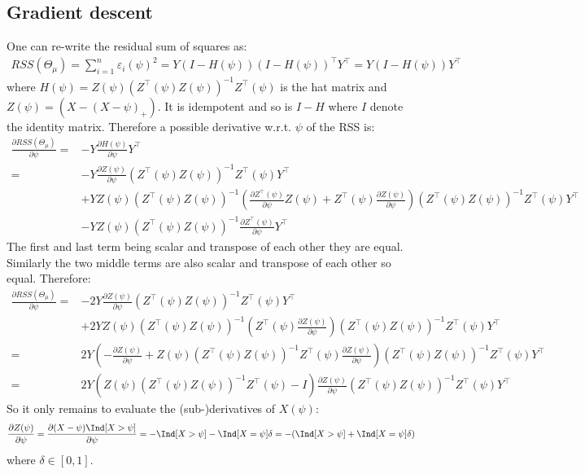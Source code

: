 \documentclass[12pt]{article}
\newcommand\trans[1]{{#1}^\intercal}%
\begin{document}
\clearpage
\subsection{Gradient descent}
\label{sec:org3b696b5}

One can re-write the residual sum of squares as:
\begin{align*}
RSS(\Theta_\mu) = \sum_{i=1}^n \varepsilon_i(\psi)^2  = Y (I-H(\psi))\trans{(I-H(\psi))}\trans{Y} = Y (I-H(\psi))\trans{Y}
\end{align*}
where \(H(\psi) =
Z(\psi)\left(\trans{Z}(\psi)Z(\psi)\right)^{-1}\trans{Z}(\psi)\) is
the hat matrix and \({Z(\psi)=(X-(X-\psi)_+)}\). It is idempotent and so is \(I-H\) where \(I\) denote
the identity matrix. Therefore a possible derivative w.r.t. \(\psi\) of the RSS is:
\begin{align*}
\frac{\partial RSS(\Theta_\mu)}{\partial \psi} =& - Y \frac{\partial H(\psi)}{\partial \psi} \trans{Y} \\
 =& - Y \frac{\partial Z(\psi)}{\partial \psi} \left(\trans{Z}(\psi) Z(\psi)\right)^{-1}\trans{Z}(\psi) \trans{Y} \\
  & + Y Z(\psi) \left(\trans{Z}(\psi) Z(\psi)\right)^{-1} \left(\frac{\partial \trans{Z}(\psi)}{\partial \psi}Z(\psi)+\trans{Z}(\psi)\frac{\partial Z(\psi)}{\partial \psi} \right) \left(\trans{Z}(\psi) Z(\psi)\right)^{-1}\trans{Z}(\psi) \trans{Y} \\
  &  - Y Z(\psi) \left(\trans{Z}(\psi)  Z(\psi)\right)^{-1} \frac{\partial \trans{Z}(\psi)}{\partial \psi} \trans{Y}
\end{align*}
The first and last term being scalar and transpose of each other they
are equal. Similarly the two middle terms are also scalar and
transpose of each other so equal. Therefore:
\begin{align*}
\frac{\partial RSS(\Theta_\mu)}{\partial \psi}
=& - 2 Y \frac{\partial Z(\psi)}{\partial \psi} \left(\trans{Z}(\psi) Z(\psi)\right)^{-1}\trans{Z}(\psi) \trans{Y} \\
 & + 2 Y Z(\psi) \left(\trans{Z}(\psi) Z(\psi)\right)^{-1} \left(\trans{Z}(\psi)\frac{\partial Z(\psi)}{\partial \psi} \right) \left(\trans{Z}(\psi) Z(\psi)\right)^{-1}\trans{Z}(\psi) \trans{Y} \\
=& 2 Y \left(- \frac{\partial Z(\psi)}{\partial \psi} + Z(\psi) \left(\trans{Z}(\psi) Z(\psi)\right)^{-1} \trans{Z}(\psi)\frac{\partial Z(\psi)}{\partial \psi} \right) \left(\trans{Z}(\psi) Z(\psi)\right)^{-1}\trans{Z}(\psi) \trans{Y} \\
=& 2 Y \left(Z(\psi) \left(\trans{Z}(\psi) Z(\psi)\right)^{-1} \trans{Z}(\psi) - I \right) \frac{\partial Z(\psi)}{\partial \psi} \left(\trans{Z}(\psi) Z(\psi)\right)^{-1}\trans{Z}(\psi) \trans{Y}
\end{align*}
So it only remains to evaluate the (sub-)derivatives of \(X(\psi)\):
\begin{align*}
\frac{\partial Z(\psi)}{\partial \psi} = \frac{\partial (X-\psi)\Ind[X>\psi]}{\partial \psi}
 = -\Ind[X>\psi] - \Ind[X=\psi]\delta = -(\Ind[X>\psi] +\Ind[X=\psi]\delta) 
\end{align*}
where \(\delta \in [0,1]\).
\end{document}
